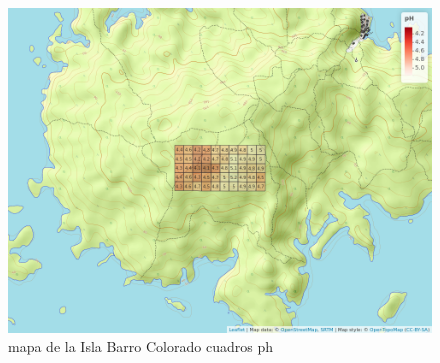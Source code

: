 \documentclass[11pt,]{article}
\begin{document}
\begin{figure}
\centering
\includegraphics[width=1.00000\textwidth]{mapa_cuadros_ph.png}
\caption{mapa de la Isla Barro Colorado cuadros ph\label{fig:bci_map}}
\end{figure}
\end{document}
